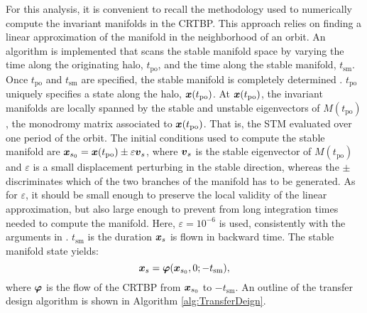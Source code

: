 For this analysis, it is convenient to recall the methodology used to numerically compute the invariant manifolds in the CRTBP. This approach relies on finding a linear approximation of the manifold in the neighborhood of an orbit. An algorithm is implemented that scans the stable manifold space by varying the time along the originating halo, $t_{\textrm{po}}$, and the time along the stable manifold, $t_{\textrm{sm}}$. Once $t_{\textrm{po}}$ and $t_{\textrm{sm}}$ are specified, the stable manifold is completely determined \cite{topputo2016fastmanifolds}. $t_{\textrm{po}}$ uniquely specifies a state along the halo, $\boldsymbol{x}(t_{\textrm{po}})$. At $\boldsymbol{x}(t_{\textrm{po}})$, the invariant manifolds are locally spanned by the stable and unstable eigenvectors of $M(t_{\textrm{po}})$, the monodromy matrix associated to $\boldsymbol{x}(t_{\textrm{po}})$. That is, the STM evaluated over one period of the orbit. The initial conditions used to compute the stable manifold are $\boldsymbol{x}_{s_0} = \boldsymbol{x}(t_{\textrm{po}})\pm\varepsilon \boldsymbol{v}_s$, where $\boldsymbol{v}_s$ is the stable eigenvector of $M(t_{\textrm{po}})$ and $\varepsilon$ is a small displacement perturbing in the stable direction, whereas the $\pm$ discriminates which of the two branches of the manifold has to be generated. As for $\varepsilon$, it should be small enough to preserve the local validity of the linear approximation, but also large enough to prevent from long integration times needed to compute the manifold. Here, $\varepsilon=10^{-6}$ is used, consistently with the arguments in \textcite{gomez1993study}. $t_{\textrm{sm}}$ is the duration $\boldsymbol{x}_s$ is flown in backward time. The stable manifold state yields:
%
\begin{equation}
\label{eq:stablemanifoldstate}
\boldsymbol{x}_s = \boldsymbol{\varphi}(\boldsymbol{x}_{s_0},0;-t_{\textrm{sm}}),
\end{equation}
%
where $\boldsymbol{\varphi}$ is the flow of the CRTBP from $\boldsymbol{x}_{s_0}$ to $-t_{\textrm{sm}}$. An outline of the transfer design algorithm is shown in Algorithm \ref{alg:TransferDeign}.
%
